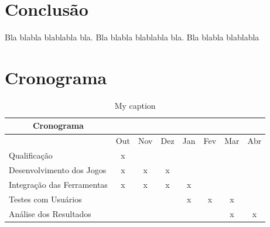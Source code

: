\documentclass[dm,ppgcomp]{texfurg} %
\begin{document}
\chapter{Conclusão}

  Bla blabla blablabla bla.  Bla blabla blablabla bla.  Bla blabla blablabla
  
\chapter{Cronograma}

\begin{table}[ht]
\centering
\caption{My caption}
\label{my-label}
\begin{tabular}{|l|c|c|c|c|c|c|c|}
\hline
\multicolumn{1}{|c|}{Cronograma}                &                          &                          &                          &                          &                          &                          &                          \\ \hline
                                                & \multicolumn{1}{l|}{Out} & \multicolumn{1}{l|}{Nov} & \multicolumn{1}{l|}{Dez} & \multicolumn{1}{l|}{Jan} & \multicolumn{1}{l|}{Fev} & \multicolumn{1}{l|}{Mar} & \multicolumn{1}{l|}{Abr} \\ \hline
Qualificação                                    & x                        &                          &                          &                          &                          &                          &                          \\ \hline
Desenvolvimento dos Jogos                       & x                        & x                        & x                        &                          &                          &                          &                          \\ \hline
Integração das Ferramentas                      & x                        & x                        & x                        & x                        &                          &                          &                          \\ \hline
Testes com Usuários                             &                          &                          &                          & x                        & x                        & x                        &                          \\ \hline
Análise dos Resultados                          &                          &                          &                          &                          &                          & x                        & x                        \\ \hline

\end{tabular}
\end{table}
\end{document}

